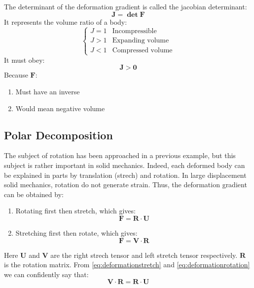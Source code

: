The determinant of the deformation gradient is called the jacobian determinant:
\begin{equation}
    \mathbf{J = \det F}    
\end{equation}
It represents the volume ratio of a body:
$$  
    \begin{cases}
        J = 1 & \text{Incompressible}   \\
        J > 1 & \text{Expanding volume} \\
        J < 1 & \text{Compressed volume}
    \end{cases}
$$
It must obey:
\begin{equation}
    \mathbf{J > 0}
\end{equation}
Because $\mathbf{F}$: \begin{enumerate}
    \item Must have an inverse
    \item Would mean negative volume
\end{enumerate} 

\subsection{Polar Decomposition}
The subject of rotation has been approached in a previous example, but this subject is rather important in solid mechanics. Indeed, each deformed body can be explained in parts by translation (strech) and rotation. In large displacement solid mechanics, rotation do not generate strain. Thus, the deformation gradient can be obtained by:

\begin{enumerate}
    \item Rotating first then stretch, which gives:
    \begin{equation}
        \mathbf{F = R \cdot U}
        \label{eq:deformationstretch}
    \end{equation}
    \item Stretching first then rotate, which gives:
    \begin{equation}
        \mathbf{F = V \cdot R}
        \label{eq:deformationrotation}
    \end{equation}
\end{enumerate}



Here $\mathbf{U}$ and $\mathbf{V}$ are the right strech tensor and left stretch tensor respectively. $\mathbf{R}$ is the rotation matrix. From \cref{eq:deformationstretch}  and \cref{eq:deformationrotation} we can confidently say that:
\begin{equation}
    \mathbf{V \cdot R = R \cdot U}
\end{equation}

